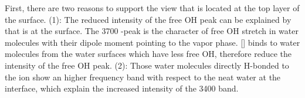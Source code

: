 %
%
%
%

First, there are two reasons to support the view that \nitrate is located at the top layer of the surface.
(1): The reduced intensity of the free OH peak can be explained by that \nitrate is at the surface.
The 3700 \centimeter-peak is the character of free OH stretch in water molecules with 
their dipole moment pointing to the vapor phase. [\cite{Du93,Baldelli1997}] 
\nitrate binds to water molecules from the water surfaces which have less free OH, therefore reduce the intensity of the free OH peak.
(2): Those water molecules directly H-bonded to the \nitrate ion show an higher frequency band with respect to the neat 
water at the interface, which explain the increased intensity of the 3400 \cm band.

